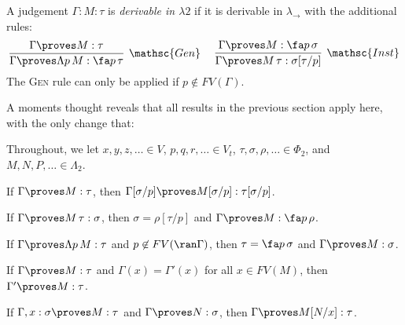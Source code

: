 \documentclass[reqno]{amsart}
\begin{document}
    \begin{definition}
        A judgement $\Gamma:M:\tau$ is \textit{derivable in $\lambda2$} if it is derivable in $\lambda_\rightarrow$ with the additional rules:
        \begin{equation*}
            \infer[\mathsc{Gen}]{\Gamma\proves\Lambda p\,M:\fa p\,\tau}{\Gamma\proves M:\tau}\ \ \ \ 
            \infer[\mathsc{Inst}]{\Gamma\proves M\,\tau:\sigma[\tau/p]}{\Gamma\proves M:\fa p\,\sigma}
        \end{equation*}
        The \textsc{Gen} rule can only be applied if $p\not\in FV(\Gamma)$.
    \end{definition}

    A moments thought reveals that all results in the previous section apply here, with the only change that:

    \begin{notation}
        Throughout, we let $x,y,z,\ldots\in V$, $p,q,r,\ldots\in V_t$, $\tau,\sigma,\rho,\ldots\in\Phi_2$, and $M,N,P,\ldots\in\Lambda_2$.
    \end{notation}

    \begin{lemma}\label{lem:polymorphic_variable_substitution}
        If $\Gamma\proves M:\tau$, then $\Gamma[\sigma/p]\proves M[\sigma/p]:\tau[\sigma/p]$.
    \end{lemma}

    \begin{lemma}\label{lem:polymorphic_generation_1}
        If $\Gamma\proves M\,\tau:\sigma$, then $\sigma=\rho[\tau/p]$ and $\Gamma\proves M:\fa p\,\rho$.
    \end{lemma}

    \begin{lemma}\label{lem:polymorphic_generation_2}
        If $\Gamma\proves\Lambda p\,M:\tau$ and $p\not\in FV(\ran\Gamma)$, then $\tau=\fa p\,\sigma$ and $\Gamma\proves M:\sigma$.
    \end{lemma}

    \begin{lemma}\label{lem:polymorphic_change_of_context}
        If $\Gamma\proves M:\tau$ and $\Gamma(x)=\Gamma'(x)$ for all $x\in FV(M)$, then $\Gamma'\proves M:\tau$.
    \end{lemma}

    \begin{lemma}\label{lem:polymorphic_substitution}
        If $\Gamma,x:\sigma\proves M:\tau$ and $\Gamma\proves N:\sigma$, then $\Gamma\proves M[N/x]:\tau$.
    \end{lemma}
\end{document}

